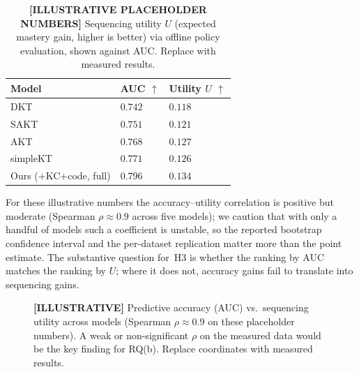\begin{table}[t]
\caption{\textbf{[ILLUSTRATIVE PLACEHOLDER NUMBERS]} Sequencing utility
$U$ (expected mastery gain, higher is better) via offline policy
evaluation, shown against AUC. Replace with measured results.}
\label{tab:sequencing}
\centering
\small
\begin{tabular}{@{}lll@{}}
\toprule
\textbf{Model} & \textbf{AUC $\uparrow$} & \textbf{Utility $U$ $\uparrow$} \\
\midrule
DKT                    & $0.742$ & $0.118$ \\
SAKT                   & $0.751$ & $0.121$ \\
AKT                    & $0.768$ & $0.127$ \\
simpleKT               & $0.771$ & $0.126$ \\
Ours (+KC+code, full)  & $\mathbf{0.796}$ & $\mathbf{0.134}$ \\
\bottomrule
\end{tabular}
\end{table}

For these illustrative numbers the accuracy--utility correlation is
positive but moderate (Spearman $\rho \approx 0.9$ across five models);
we caution that with only a handful of models such a coefficient is
unstable, so the reported bootstrap confidence interval and the
per-dataset replication matter more than the point estimate. The
substantive question for~H3 is whether the ranking by AUC matches the
ranking by $U$; where it does not, accuracy gains fail to translate into
sequencing gains.

\begin{figure}[t]
\centering
{}
\caption{\textbf{[ILLUSTRATIVE]} Predictive accuracy (AUC) vs.\ sequencing
utility across models (Spearman $\rho \approx 0.9$ on these placeholder
numbers). A weak or non-significant $\rho$ on the measured data would be
the key finding for RQ(b). Replace coordinates with measured results.}
\label{fig:corr}
\end{figure}

